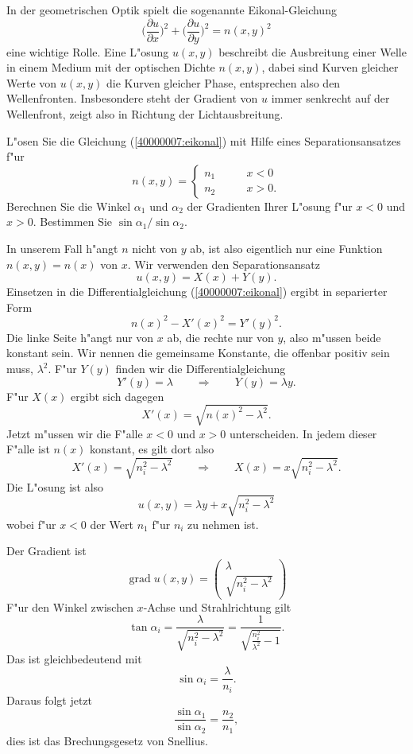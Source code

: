 In der geometrischen Optik spielt die sogenannte Eikonal-Gleichung
\begin{equation}
\biggl( \frac{\partial u}{\partial x}\biggr)^2
+
\biggl( \frac{\partial u}{\partial y}\biggr)^2
=
n(x,y)^2
\label{40000007:eikonal}
\end{equation}
eine wichtige Rolle.
Eine L"osung $u(x,y)$ beschreibt die
Ausbreitung einer Welle in einem Medium mit der optischen
Dichte  $n(x,y)$, dabei sind Kurven gleicher Werte von $u(x,y)$
die Kurven gleicher Phase, entsprechen also den Wellenfronten.
Insbesondere steht der Gradient von $u$ immer senkrecht auf
der Wellenfront, zeigt also in Richtung der Lichtausbreitung.

L"osen Sie die Gleichung
(\ref{40000007:eikonal}) mit Hilfe eines Separationsansatzes
f"ur 
\[
n(x,y)=
\begin{cases}n_1&\qquad x< 0\\
n_2&\qquad x>0.
\end{cases}
\]
Berechnen Sie die Winkel $\alpha_1$ und $\alpha_2$ der Gradienten
Ihrer L"osung f"ur $x<0$ und $x>0$. Bestimmen Sie 
$\sin\alpha_1/\sin\alpha_2$.

\begin{loesung}
In unserem Fall h"angt $n$ nicht von $y$ ab, ist also eigentlich
nur eine Funktion $n(x,y)=n(x)$ von $x$.
Wir verwenden den Separationsansatz
\[
u(x,y)=X(x) + Y(y).
\]
Einsetzen in die Differentialgleichung
(\ref{40000007:eikonal}) ergibt in separierter Form
\[
n(x)^2-X'(x)^2=Y'(y)^2.
\]
Die linke Seite h"angt nur von $x$ ab, die rechte nur von $y$,
also m"ussen beide konstant sein.
Wir nennen die gemeinsame Konstante, die offenbar positiv sein
muss, $\lambda^2$.
F"ur $Y(y)$ finden wir die Differentialgleichung
\[
Y'(y)=\lambda \qquad\Rightarrow\qquad Y(y)=\lambda y.
\]
F"ur $X(x)$ ergibt sich dagegen
\[
X'(x)=\sqrt{n(x)^2-\lambda^2}.
\]
Jetzt m"ussen wir die F"alle $x<0$ und $x>0$ unterscheiden.
In jedem dieser F"alle ist $n(x)$ konstant, es gilt dort
also
\[
X'(x)=\sqrt{n_i^2-\lambda^2}
\qquad
\Rightarrow
\qquad
X(x)=x\sqrt{n_i^2-\lambda^2}.
\]
Die L"osung ist also
\[
u(x,y)=\lambda y + x\sqrt{n_i^2-\lambda^2}
\]
wobei f"ur $x<0$ der Wert $n_1$ f"ur $n_i$ zu nehmen ist.

Der Gradient ist
\[
\operatorname{grad}u(x,y)
=
\begin{pmatrix}
\lambda\\
\sqrt{n_i^2-\lambda^2}
\end{pmatrix}
\]
F"ur den Winkel zwischen $x$-Achse und Strahlrichtung gilt
\[
\tan\alpha_i
=
\frac{\lambda}{\sqrt{n_i^2-\lambda^2}}
=
\frac1{\sqrt{\frac{n_i^2}{\lambda^2}-1}}.
\]
Das ist gleichbedeutend mit
\[
\sin\alpha_i=\frac{\lambda}{n_i}.
\]
Daraus folgt jetzt
\[
\frac{ \sin\alpha_1}{\sin\alpha_2}=\frac{n_2}{n_1},
\]
dies ist das Brechungsgesetz von Snellius.
\end{loesung}
